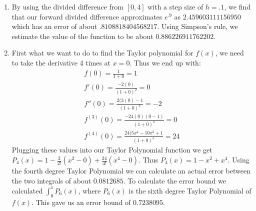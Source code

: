 \documentclass[12pt,letterpaper]{article}
\begin{document}
\begin{enumerate}
    \item
    By using the divided difference from $[0, 4]$ with a step size of $h = .1$, we find that our forward divided difference approximates $e^{.9}$ as $2.459603111156950$ which has an error of about $.8108818404568217$. Using Simpson's rule, we estimate the value of the function to be about $0.886226911762202$. 
    
    \item
    First what we want to do to find the Taylor polynomial for $f(x)$, we need to take the derivative 4 times at $x = 0$. Thus we end up with:
    \begin{gather}
        f(0) = \frac{1}{1+0} = 1\\
        f'(0) = \frac{-2(0)}{(1+0)^2} = 0\\
        f''(0) = \frac{2(3(0)-1}{(1+0)^3} = -2\\
        f^{(3)}(0) = \frac{-24(0)(0-1)}{(1+0)^4} = 0\\
        f^{(4)}(0) = \frac{24(5x^4 - 10x^2 + 1}{(1+0)^5} = 24
    \end{gather}
    Plugging these values into our Taylor Polynomial function we get $P_4(x) = 1 - \frac{2}{2!}(x^2 - 0) + \frac{24}{4!}(x^4 - 0)$. Thus $P_4(x) = 1 - x^2 + x^4$. Using the fourth degree Taylor Polynomial we can calculate an actual error between the two integrals of about $0.0812685$. To calculate the error bound we calculated $\int_0^1 P_6(x)$, where $P_6(x)$ is the sixth degree Taylor Polynomial of $f(x)$. This gave us an error bound of $0.7238095$. 
    
    
\end{enumerate}
\end{document}
